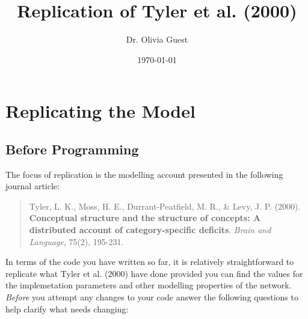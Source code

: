 \documentclass[a4paper,10pt]{article}
\title{Replication of Tyler et al. (2000)}
\author{Dr. Olivia Guest}
\date{\today}
\begin{document}
\maketitle
\section{Replicating the Model}
\subsection{Before Programming}
The focus of replication is the modelling account presented in the following journal article:
\begin{quote}
Tyler, L. K., Moss, H. E., Durrant-Peatfield, M. R., \& Levy, J. P. (2000). \textbf{Conceptual structure and the structure of concepts: A distributed account of category-specific deficits}. \textit{Brain and Language}, 75(2), 195-231.
\end{quote}
In terms of the code you have written so far, it is relatively straightforward to replicate what Tyler et al. (2000) have done provided you can find the values for the implemetation parameters and other modelling properties of the network. \emph{Before} you attempt any changes to your code answer the following questions to help clarify what needs changing: 
\end{document}
